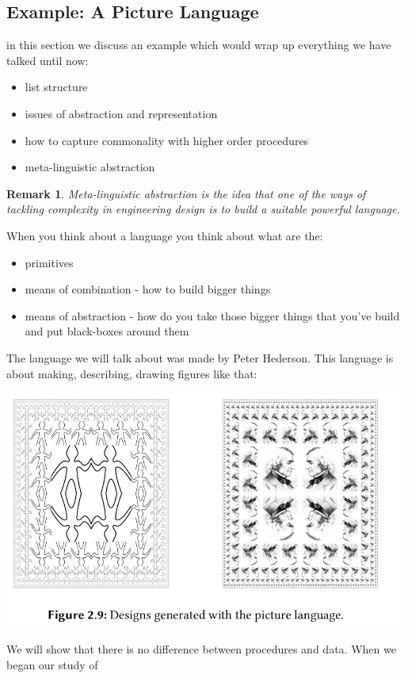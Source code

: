 \documentclass[a4paper,twoside]{article}
\newtheorem{remark}[theorem]{Remark}
\numberwithin{equation}{section}
\begin{document}
\subsection{Example: A Picture Language}
in this section we discuss an example which would wrap up everything we have talked until now:
\begin{itemize}
    \item list structure
    \item issues of abstraction and representation
    \item how to capture commonality with higher order procedures
    \item meta-linguistic abstraction
\end{itemize}

\begin{remark}
    Meta-linguistic abstraction is the idea that one of the ways of tackling complexity in
    engineering design is to build a suitable powerful language.
\end{remark}
When you think about a language you think about what are the:
\begin{itemize}
    \item primitives
    \item means of combination - how to build bigger things
    \item means of abstraction - how do you take those bigger things that you've build and put
          black-boxes around them
\end{itemize}
The language we will talk about was made by Peter Hederson. This language is about making, describing,
drawing figures like that:
\begin{center}
    \includegraphics[scale = 0.5]{assets/pictures.png}
\end{center}
We will show that there is no difference between procedures and data. When we began our study of
\end{document}
